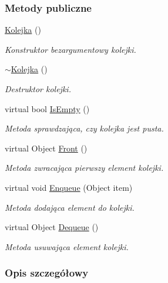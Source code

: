 \subsubsection*{Metody publiczne}
\begin{DoxyCompactItemize}
\item 
\hyperlink{class_kolejka_acba6bee79d22a4e0de01f1ad169d3889}{Kolejka} ()
\begin{DoxyCompactList}\small\item\em Konstruktor bezargumentowy kolejki. \end{DoxyCompactList}\item 
\hyperlink{class_kolejka_a145c1e99eea786ec7832bdc467048a2d}{$\sim$\-Kolejka} ()
\begin{DoxyCompactList}\small\item\em Destruktor kolejki. \end{DoxyCompactList}\item 
virtual bool \hyperlink{class_kolejka_a15a8e2eff269ee2d6264af30cfd23cb2}{Is\-Empty} ()
\begin{DoxyCompactList}\small\item\em Metoda sprawdzająca, czy kolejka jest pusta. \end{DoxyCompactList}\item 
virtual Object \hyperlink{class_kolejka_a04e41ef06540e8a5f5338da175f26a1f}{Front} ()
\begin{DoxyCompactList}\small\item\em Metoda zwracająca pierwszy element kolejki. \end{DoxyCompactList}\item 
virtual void \hyperlink{class_kolejka_a726ad18814137293bfdfd0500da27038}{Enqueue} (Object item)
\begin{DoxyCompactList}\small\item\em Metoda dodająca element do kolejki. \end{DoxyCompactList}\item 
virtual Object \hyperlink{class_kolejka_a61f6ec1436c1e95ce8675c8ccaf3e469}{Dequeue} ()
\begin{DoxyCompactList}\small\item\em Metoda usuwająca element kolejki. \end{DoxyCompactList}\end{DoxyCompactItemize}


\subsubsection{Opis szczegółowy}
